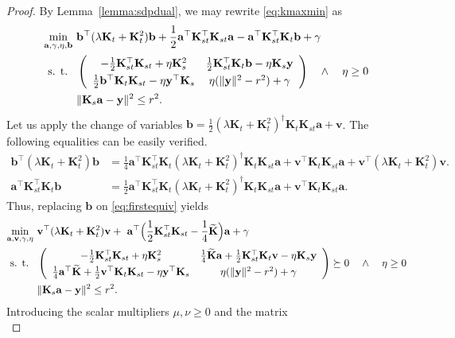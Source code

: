\documentclass[twoside,11pt]{article}
\newcommand{\wt}{\widetilde}
\newcommand{\mat}[1]{{\mathbf #1}}
\renewcommand{\a}{\mat{a}}
\renewcommand{\b}{\mat{b}}
\newcommand{\1}{\mat{1}}
\newcommand{\Ks}{\mat{K}_s}
\newcommand{\Kst}{\mat{K}_{st}}
\newcommand{\Kt}{\mat{K}_{t}}
\renewcommand{\v}{\mat{v}}
\newcommand{\y}{\mat{y}}
\begin{document}
\begin{proof}

By Lemma~\ref{lemma:sdpdual}, we may rewrite
\eqref{eq:kmaxmin} as
\begin{align}
\label{eq:firstequiv}
  \min_{\a, \gamma , \eta, \b}
 & \ \b^\top (\lambda \Kt + \Kt^2) \b + \frac{1}{2}
   \a^\top   \Kst^\top \Kst \a - \a^\top  \Kst^\top \Kt \b + \gamma \\
\text{s. t. } & \
 \left(
\def\arraystretch{1.3}
\begin{array}{cc}
 -\frac{1}{2} \Kst^\top \Kst + \eta \Ks^2  &
 \frac{1}{2}\Kst^\top \Kt \b - \eta \Ks \y \\
\frac{1}{2} \b^\top  \Kt \Kst - \eta \y^\top \Ks &
 \eta (\|\y\|^2 - r^2) + \gamma
\end{array}
\right)  \quad \wedge \quad \eta \geq 0 \nonumber \\
& \ \|\Ks \a - \y\|^2 \leq r^2. \nonumber
\end{align}
Let us apply the change of variables
$\b = \frac{1}{2}(\lambda \Kt + \Kt^2)^{\dag} \Kt \Kst \a +\v$.
The following equalities can be easily verified.
\begin{align*}
\b^\top (\lambda \Kt + \Kt^2) \b
&  = \frac{1}{4} \a^\top \Kst^\top \Kt (\lambda \Kt + \Kt^2)^\dag \Kt \Kst \a + \v^\top \Kt \Kst \a + \v^\top (\lambda \Kt + \Kt^2) \v.\\
\a^\top \Kst^\top  \Kt \b
& = \frac{1}{2} \a^\top \Kst^\top \Kt (\lambda \Kt + \Kt^2)^\dag \Kt \Kst \a + \v^\top \Kt \Kst \a.
\end{align*}
Thus, replacing $\b$ on \eqref{eq:firstequiv} yields
\begin{align*}
  \min_{\a, \v, \gamma , \eta}
 & \ \v^\top (\lambda \Kt + \Kt^2) \v + \
   \a^\top \Big(\frac{1}{2} \Kst^\top \Kst
   - \frac{1}{4}\wt{\mat K} \Big)\a + \gamma\\
\text{s. t. } & \
 \left(
\def\arraystretch{1.3}
\begin{array}{cc}
 -\frac{1}{2} \Kst^\top \Kst + \eta \Ks^2
& \frac{1}{4} \wt{\mat K}\a + \frac{1}{2}\Kst^\top \Kt \v - \eta \Ks \y \\
\frac{1}{4} \a^\top \wt{\mat K} + \frac{1}{2}\v^\top \Kt \Kst
- \eta \y^\top \Ks
& \eta (\|\y\|^2 - r^2) + \gamma
\end{array}
\right) \succeq 0  \quad \wedge \quad \eta \geq 0 \nonumber \\
& \ \|\Ks \a - \y\|^2 \leq r^2. \nonumber
\end{align*}
Introducing the scalar multipliers $\mu, \nu \geq 0$ and the matrix
\begin{equation*}

\end{equation*}
\end{proof}
\end{document}
